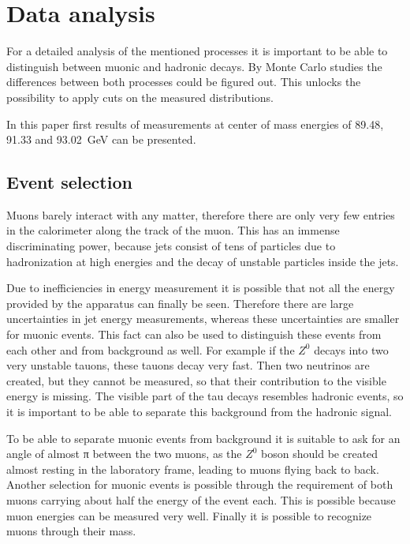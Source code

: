 \documentclass[epj,nopacs]{svjour}
\begin{document}
\section{ Data analysis}

For a detailed analysis of the mentioned processes it is important to be able
to distinguish between muonic and hadronic decays. By Monte Carlo studies the
differences between both processes could be figured out. This unlocks the
possibility to apply cuts on the measured distributions.

In this paper first results of measurements at center of mass energies of
\num{89.48}, \num{91.33} and \SI{93.02}{\giga\electronvolt} can be presented.

\subsection{ Event selection}
Muons barely interact with any matter, therefore there are only very few
entries in the calorimeter along the track of the muon. This has an immense
discriminating power, because jets consist of tens of particles due to
hadronization at high energies and the decay of unstable particles inside the
jets.

Due to inefficiencies in energy measurement it is possible that not all the
energy provided by the apparatus can finally be seen. Therefore there are large
uncertainties in jet energy measurements, whereas these uncertainties are
smaller for muonic events. This fact can also be used to distinguish these
events from each other and from background as well. For example if the $Z^0$
decays into two very unstable tauons, these tauons decay very fast. Then two
neutrinos are created, but they cannot be measured, so that their contribution
to the visible energy is missing. The visible part of the tau decays resembles
hadronic events, so it is important to be able to separate this background from
the hadronic signal.

To be able to separate muonic events from background it is suitable to ask for
an angle of almost π between the two muons, as the $Z^0$ boson should be created
almost resting in
the laboratory frame, leading to muons flying back to back. Another selection
for muonic events is possible through the requirement of both muons carrying
about half the energy of the event each. This is possible because muon energies
can be measured very well. Finally it is possible to recognize muons through
their mass.
\end{document}

